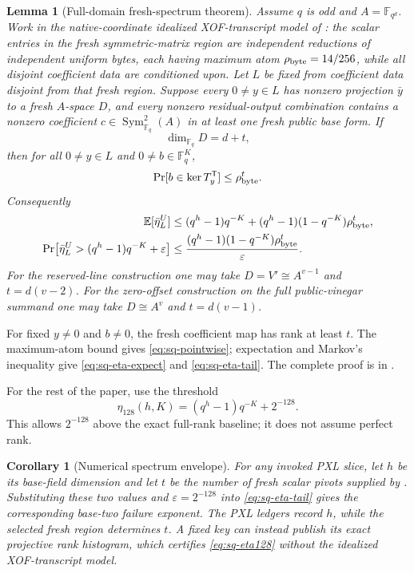 \documentclass[11pt]{article}
\newtheorem{lemma}[lemma]{Lemma}
\newtheorem{corollary}[corollary]{Corollary}
\newcommand{\F}{\mathbb F}
\begin{document}
\begin{lemma}[Full-domain fresh-spectrum theorem]
\label{lem:sq-full-domain-spectrum}
Assume $q$ is odd and $A=\F_{q^d}$.  Work in the native-coordinate idealized
XOF-transcript model of : the scalar entries in the
fresh symmetric-matrix region are independent reductions of independent uniform
bytes, each having maximum atom $\rho_{\rm byte}=14/256$, while all disjoint
coefficient data are conditioned upon.  Let $L$ be fixed from coefficient data
disjoint from that fresh region.  Suppose every $0\ne y\in L$
has nonzero projection $\bar y$ to a fresh $A$-space $D$, and every nonzero
residual-output combination contains a nonzero coefficient
$c\in\operatorname{Sym}_{\F_q}^2(A)$ in at least one fresh public base form.
If
\[
 \dim_{\F_q}D=d+t,
\]
then for all $0\ne y\in L$ and $0\ne b\in\F_q^K$,
\begin{equation}
 \Pr[b\in\ker T_y^{\mathsf T}]\le\rho_{\rm byte}^t.             \label{eq:sq-pointwise}
\end{equation}
Consequently
\begin{align}
 \mathbb E[\bar\eta_L^U]
 &\le (q^h-1)q^{-K}
 +(q^h-1)(1-q^{-K})\rho_{\rm byte}^t,                            \label{eq:sq-eta-expect}\\
 \Pr\!\left[
  \bar\eta_L^U>(q^h-1)q^{-K}+\varepsilon
 \right]
 &\le
 \frac{(q^h-1)(1-q^{-K})\rho_{\rm byte}^t}{\varepsilon}.
                                                                    \label{eq:sq-eta-tail}
\end{align}
For the reserved-line construction one may take
$D=V'\cong A^{v-1}$ and $t=d(v-2)$.  For the zero-offset construction on the
full public-vinegar summand one may take $D\cong A^v$ and $t=d(v-1)$.
\end{lemma}

For fixed $y\ne0$ and $b\ne0$, the fresh coefficient map has rank at least
$t$.  The maximum-atom bound gives \eqref{eq:sq-pointwise}; expectation and
Markov's inequality give \eqref{eq:sq-eta-expect} and
\eqref{eq:sq-eta-tail}.  The complete proof is in
.

For the rest of the paper, use the threshold
\begin{equation}
 \boxed{
 \eta_{128}(h,K)=(q^h-1)q^{-K}+2^{-128}.}
 \label{eq:sq-eta128}
\end{equation}
This allows $2^{-128}$ above the exact full-rank baseline; it does not assume
perfect rank.

\begin{corollary}[Numerical spectrum envelope]
\label{cor:sq-spectrum-tails}
For any invoked PXL slice, let $h$ be its base-field dimension and let $t$ be
the number of fresh scalar pivots supplied by
.  Substituting these two values and
$\varepsilon=2^{-128}$ into \eqref{eq:sq-eta-tail} gives the corresponding
base-two failure exponent.  The PXL ledgers record $h$, while the selected
fresh region determines $t$.  A fixed key can instead publish its exact
projective rank histogram, which certifies \eqref{eq:sq-eta128} without the
idealized XOF-transcript model.
\end{corollary}
\end{document}
